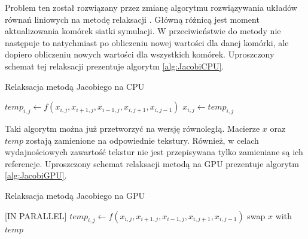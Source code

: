 Problem ten został rozwiązany przez zmianę algorytmu rozwiązywania układów
równań liniowych na metodę relaksacji . Główną różnicą jest moment
aktualizowania komórek siatki symulacji. W przeciwieństwie do metody  nie następuje to natychmiast po obliczeniu nowej wartości dla danej
komórki, ale dopiero obliczeniu nowych wartości dla wszystkich komórek.
Uproszczony schemat tej relaksacji prezentuje algorytm \ref{alg:JacobiCPU}.

\begin{algorithm}[!h]
  \caption{Relaksacja metodą Jacobiego na CPU}
  \label{alg:JacobiCPU}
\begin{algorithmic}
    \State $temp_{i,j}\gets f(x_{i,j}, x_{i+1,j}, x_{i-1,j}, x_{i,j+1}, x_{i,j-1})$
  \EndFor
    \State $x_{i,j}\gets temp_{i,j}$
  \EndFor
\EndFor
\end{algorithmic}
\end{algorithm}

Taki algorytm można już przetworzyć na wersję równoległą. Macierze $x$ oraz
$temp$  zostają zamienione na odpowiednie tekstury. Również, w celach
wydajnościowych zawartość tekstur nie jest przepisywana tylko zamieniane są
ich referencje. Uproszczony schemat relaksacji metodą  na GPU
prezentuje algorytm \ref{alg:JacobiGPU}.

\begin{algorithm}[!h]
  \caption{Relaksacja metodą Jacobiego na GPU}
  \label{alg:JacobiGPU}
\begin{algorithmic}
   [IN PARALLEL]
    \State $temp_{i,j}\gets f(x_{i,j}, x_{i+1,j}, x_{i-1,j}, x_{i,j+1}, x_{i,j-1})$
  \EndFor
  \State swap $x$ with $temp$
\EndFor
\end{algorithmic}
\end{algorithm}

